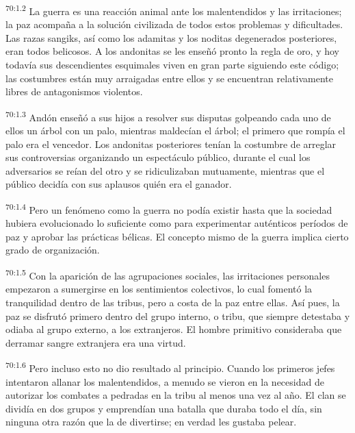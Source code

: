\par
\textsuperscript{70:1.2} La guerra es una reacción animal ante los malentendidos y las irritaciones; la paz acompaña a la solución civilizada de todos estos problemas y dificultades. Las razas sangiks, así como los adamitas y los noditas degenerados posteriores, eran todos belicosos. A los andonitas se les enseñó pronto la regla de oro, y hoy todavía sus descendientes esquimales viven en gran parte siguiendo este código; las costumbres están muy arraigadas entre ellos y se encuentran relativamente libres de antagonismos violentos.

\par
\textsuperscript{70:1.3} Andón enseñó a sus hijos a resolver sus disputas golpeando cada uno de ellos un árbol con un palo, mientras maldecían el árbol; el primero que rompía el palo era el vencedor. Los andonitas posteriores tenían la costumbre de arreglar sus controversias organizando un espectáculo público, durante el cual los adversarios se reían del otro y se ridiculizaban mutuamente, mientras que el público decidía con sus aplausos quién era el ganador.

\par
\textsuperscript{70:1.4} Pero un fenómeno como la guerra no podía existir hasta que la sociedad hubiera evolucionado lo suficiente como para experimentar auténticos períodos de paz y aprobar las prácticas bélicas. El concepto mismo de la guerra implica cierto grado de organización.

\par
\textsuperscript{70:1.5} Con la aparición de las agrupaciones sociales, las irritaciones personales empezaron a sumergirse en los sentimientos colectivos, lo cual fomentó la tranquilidad dentro de las tribus, pero a costa de la paz entre ellas. Así pues, la paz se disfrutó primero dentro del grupo interno, o tribu, que siempre detestaba y odiaba al grupo externo, a los extranjeros. El hombre primitivo consideraba que derramar sangre extranjera era una virtud.

\par
\textsuperscript{70:1.6} Pero incluso esto no dio resultado al principio. Cuando los primeros jefes intentaron allanar los malentendidos, a menudo se vieron en la necesidad de autorizar los combates a pedradas en la tribu al menos una vez al año. El clan se dividía en dos grupos y emprendían una batalla que duraba todo el día, sin ninguna otra razón que la de divertirse; en verdad les gustaba pelear.

